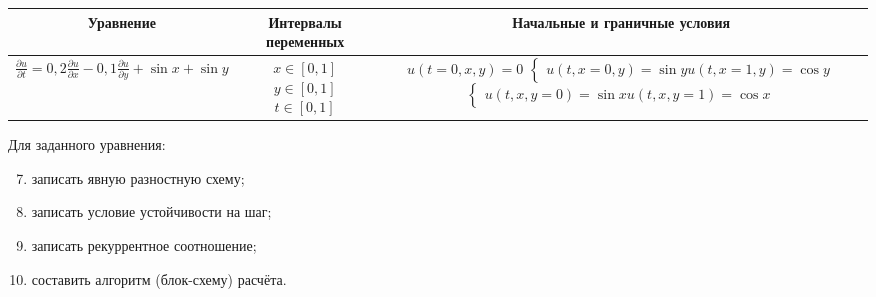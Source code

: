 \documentclass[12pt, a4paper]{report}
\begin{document}
	\begin{center}
		\begin{tabular}{||c|c|c||}
			\hline
			Уравнение & \makecell{Интервалы \\ переменных} & Начальные и граничные условия \\

			\hline
			$ \frac{\partial u}{\partial t} = 0,2\frac{\partial u}{\partial x} - 0,1\frac{\partial u}{\partial y} + \sin{x} + \sin{y} $ & \makecell{$ x \in [0, 1] $ \\ $ y \in [0, 1] $ \\ $ t \in [0, 1] $} & \makecell{$ u(t = 0, x, y) = 0 $ \\ $ \begin{cases} u(t, x = 0, y) = \sin{y} \\ u(t, x = 1, y) = \cos{y} \end{cases}$ \\ $ \begin{cases} u(t, x, y = 0) = \sin{x} \\ u(t, x, y = 1) = \cos{x} \end{cases} $} \\

			\hline
		\end{tabular}
	\end{center}
	\par
	Для заданного уравнения:
	\begin{enumerate}
		\setcounter{enumi}{6}
		\item записать явную разностную схему;
		\item записать условие устойчивости на шаг;
		\item записать рекуррентное соотношение;
		\item составить алгоритм (блок-схему) расчёта.
	\end{enumerate}
	
\end{document}
